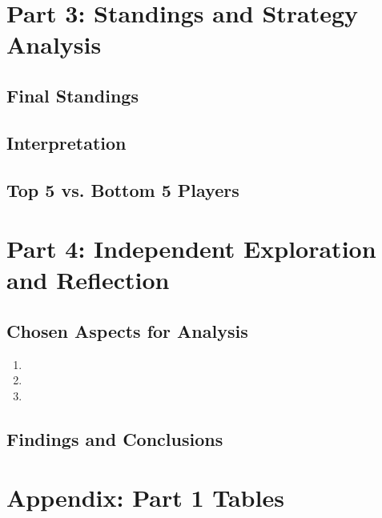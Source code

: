 \documentclass[12pt]{article}
\begin{document}
\newpage

\section*{Part 3: Standings and Strategy Analysis}

\subsection*{Final Standings}

\subsection*{Interpretation}

\subsection*{Top 5 vs. Bottom 5 Players}

\newpage

\section*{Part 4: Independent Exploration and Reflection}

\subsection*{Chosen Aspects for Analysis}
\begin{enumerate}
    \item %
    \item %
    \item %
\end{enumerate}

\subsection*{Findings and Conclusions}

\newpage
\section*{Appendix: Part 1 Tables}
\end{document}
